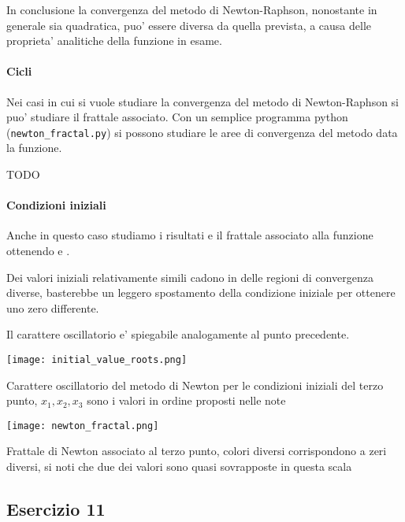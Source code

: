 In conclusione la convergenza del metodo di Newton-Raphson, nonostante in generale sia quadratica, puo' essere diversa da quella prevista, a causa delle proprieta' analitiche della funzione in esame.

\paragraph{Cicli} 

Nei casi in cui si vuole studiare la convergenza del metodo di Newton-Raphson si
puo' studiare il frattale associato. Con un semplice programma python (\texttt{newton\_fractal.py}) si possono studiare le aree di convergenza del metodo data la
funzione.

TODO

\paragraph{Condizioni iniziali} Anche in questo caso studiamo i risultati e il
frattale associato alla funzione ottenendo  e .

Dei valori iniziali relativamente simili cadono in delle regioni di convergenza 
diverse, basterebbe un leggero spostamento della condizione iniziale per ottenere uno zero differente.

Il carattere oscillatorio e' spiegabile analogamente al punto precedente.
\begin{marginfigure}
    \hspace{-2.1cm}
	\texttt{[image: initial\_value\_roots.png]}
	\caption{Carattere oscillatorio del metodo di Newton per le condizioni iniziali del terzo punto, $x_1, x_2, x_3$ sono i valori in ordine proposti nelle note}
	\label{fig:ex_10_3}
\end{marginfigure}

\begin{marginfigure}
    \hspace{-2.1cm}
	\texttt{[image: newton\_fractal.png]}
	\caption{Frattale di Newton associato al terzo punto, colori diversi corrispondono a zeri diversi, si noti che due dei valori sono quasi sovrapposte in questa scala}
	\label{fig:newton_fractal_2}
\end{marginfigure}

\subsection{Esercizio 11}


